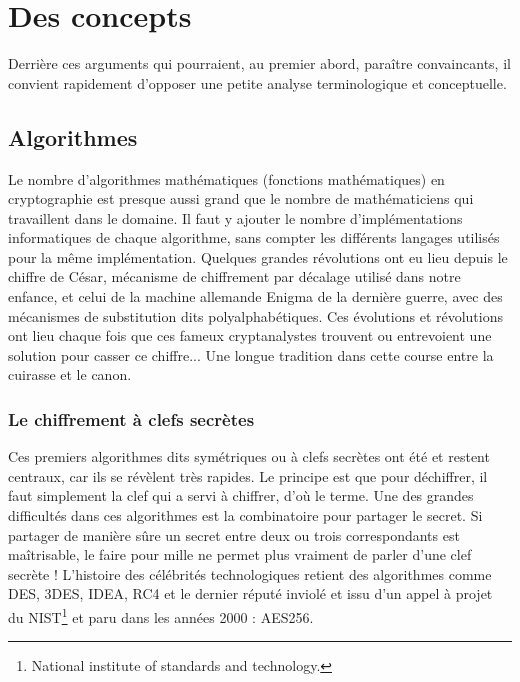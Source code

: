 \section{Des concepts}
Derrière ces arguments qui pourraient, au premier abord, paraître convaincants, il convient rapidement d'opposer une petite analyse terminologique et conceptuelle.

\subsection{Algorithmes}

Le nombre d'algorithmes mathématiques
(fonctions mathématiques) en cryptographie est presque aussi grand que le nombre de mathématiciens qui travaillent dans le domaine. Il faut y ajouter le nombre d'implémentations informatiques de chaque algorithme, sans compter les différents langages utilisés pour la même implémentation.
Quelques grandes révolutions ont eu lieu depuis le chiffre de César, mécanisme de chiffrement par décalage
utilisé dans notre enfance, et celui de la machine allemande Enigma de la dernière guerre, avec des mécanismes de substitution dits polyalphabétiques. Ces évolutions et révolutions ont lieu chaque fois que ces fameux cryptanalystes trouvent ou entrevoient une solution pour casser ce chiffre... Une longue tradition dans cette course entre la cuirasse et le canon.


\subsubsection{Le chiffrement à clefs secrètes} 
Ces premiers algorithmes dits symétriques ou à clefs secrètes ont été et restent centraux, car ils se révèlent très rapides. Le principe est que pour déchiffrer, il faut simplement la clef qui a servi à chiffrer, d'où le terme.
Une des grandes difficultés dans ces algorithmes est la combinatoire pour partager le secret. Si partager de manière sûre un secret entre deux ou trois correspondants est maîtrisable, le faire pour mille ne permet plus vraiment de parler d'une clef secrète ! L'histoire des célébrités technologiques retient des algorithmes comme DES, 3DES, IDEA, RC4 et le dernier réputé inviolé et issu d'un appel à projet du NIST\footnote{National institute of standards and technology.} et paru dans les années 2000 : AES256.

